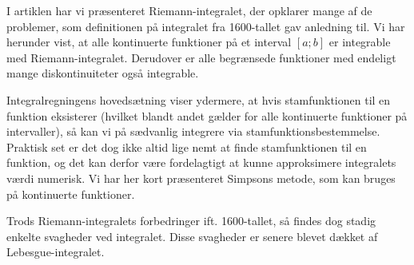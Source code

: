 I artiklen har vi præsenteret Riemann-integralet, der opklarer mange af de problemer, som definitionen på integralet fra 1600-tallet gav anledning til.
Vi har herunder vist, at alle kontinuerte funktioner på et interval $[a;b]$ er integrable med Riemann-integralet. 
Derudover er alle begrænsede funktioner med endeligt mange diskontinuiteter også integrable.

Integralregningens hovedsætning viser ydermere, at hvis stamfunktionen til en funktion eksisterer (hvilket blandt andet gælder for alle kontinuerte funktioner på intervaller), så kan vi på sædvanlig integrere via stamfunktionsbestemmelse.
Praktisk set er det dog ikke altid lige nemt at finde stamfunktionen til en funktion, og det kan derfor være fordelagtigt at kunne approksimere integralets værdi numerisk.
Vi har her kort præsenteret Simpsons metode, som kan bruges på kontinuerte funktioner.

Trods Riemann-integralets forbedringer ift. 1600-tallet, så findes dog stadig enkelte svagheder ved integralet.
Disse svagheder er senere blevet dækket af Lebesgue-integralet.
